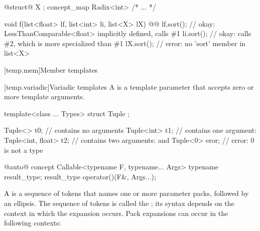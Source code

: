 \documentclass[american]{book}
\begin{document}
\begin{paras}
\begin{codeblock}
@\textcolor{addclr}{struct}@ X { };
concept_map Radix<int> { /* ... */ }

void f(list<float> lf, list<int> li, list<X> lX) 
@\textcolor{addclr}{}@{
  lf.sort(); // okay: LessThanComparable<float> implicitly defined, calls \#1
  li.sort(); // okay: calls \#2, which is more specialized than \#1
  lX.sort(); // error: no 'sort' member in list<X>
}
\end{codeblock}
\addedConcepts{\mbox{\exitexample}}
\color{black}

[temp.mem]{Member templates}

\setcounter{Paras}{9}
\pnum
{}

[temp.variadic]{Variadic templates}
\pnum
A \mbox{} is a template parameter
that accepts zero or more template arguments. \mbox{\enterexample}

\begin{codeblock}
template<class ... Types> struct Tuple { };

Tuple<> t0;             //  contains no arguments
Tuple<int> t1;          //  contains one argument: 
Tuple<int, float> t2;   //  contains two arguments:  and 
Tuple<0> eror;          // error: 0 is not a type
\end{codeblock}

\mbox{\exitexample}

 \color{addclr}
\begin{codeblock}
@\textcolor{addclr}{auto}@ concept Callable<typename F, typename... Args> {
  typename result_type;
  result_type operator()(F&, Args...);
}
\end{codeblock}
\color{black}\addedConcepts{\mbox{\exitexample\ \exitnote}}

\setcounter{Paras}{3}
\pnum
\textcolor{black}{A}  is a sequence of tokens that
names one or more parameter packs, followed by an ellipsis. The sequence
of tokens is called the ; its
syntax depends on the context in which the expansion occurs. Pack
expansions can occur in the following contexts:


\end{paras}
\end{document}
